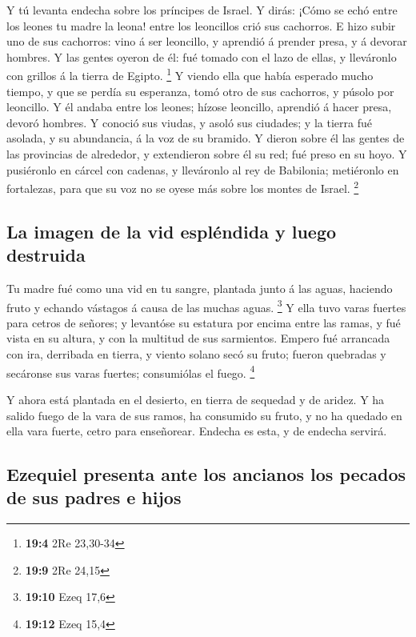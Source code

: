  Y tú levanta endecha sobre los príncipes de Israel.
 Y dirás: ¡Cómo se echó entre los leones tu madre la leona!
entre los leoncillos crió sus cachorros.  E hizo subir uno
de sus cachorros: vino á ser leoncillo, y aprendió á prender presa, y á
devorar hombres.  Y las gentes oyeron de él: fué tomado con
el lazo de ellas, y lleváronlo con grillos á la tierra de Egipto.
\footnote{\textbf{19:4} 2Re 23,30-34}  Y viendo ella que
había esperado mucho tiempo, y que se perdía su esperanza, tomó otro de
sus cachorros, y púsolo por leoncillo.  Y él andaba entre
los leones; hízose leoncillo, aprendió á hacer presa, devoró hombres.
 Y conoció sus viudas, y asoló sus ciudades; y la tierra fué
asolada, y su abundancia, á la voz de su bramido.  Y dieron
sobre él las gentes de las provincias de alrededor, y extendieron sobre
él su red; fué preso en su hoyo.  Y pusiéronlo en cárcel con
cadenas, y lleváronlo al rey de Babilonia; metiéronlo en fortalezas,
para que su voz no se oyese más sobre los montes de Israel. \footnote{\textbf{19:9}
  2Re 24,15}

\hypertarget{la-imagen-de-la-vid-espluxe9ndida-y-luego-destruida}{%
\subsection{La imagen de la vid espléndida y luego
destruida}\label{la-imagen-de-la-vid-espluxe9ndida-y-luego-destruida}}

 Tu madre fué como una vid en tu sangre, plantada junto á
las aguas, haciendo fruto y echando vástagos á causa de las muchas
aguas. \footnote{\textbf{19:10} Ezeq 17,6}  Y ella tuvo
varas fuertes para cetros de señores; y levantóse su estatura por encima
entre las ramas, y fué vista en su altura, y con la multitud de sus
sarmientos.  Empero fué arrancada con ira, derribada en
tierra, y viento solano secó su fruto; fueron quebradas y secáronse sus
varas fuertes; consumiólas el fuego. \footnote{\textbf{19:12} Ezeq 15,4}

 Y ahora está plantada en el desierto, en tierra de
sequedad y de aridez.  Y ha salido fuego de la vara de sus
ramos, ha consumido su fruto, y no ha quedado en ella vara fuerte, cetro
para enseñorear. Endecha es esta, y de endecha servirá.

\hypertarget{ezequiel-presenta-ante-los-ancianos-los-pecados-de-sus-padres-e-hijos}{%
\subsection{Ezequiel presenta ante los ancianos los pecados de sus
padres e
hijos}\label{ezequiel-presenta-ante-los-ancianos-los-pecados-de-sus-padres-e-hijos}}

